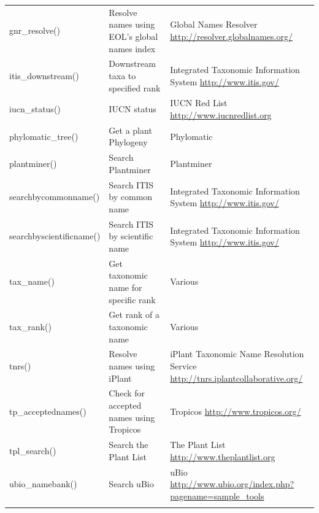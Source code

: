 \begin{sloppypar}
{\begin{longtable}{P{3cm}P{4cm}P{5cm}}
gnr\_resolve() & Resolve names using EOL's global names index & Global Names Resolver \newline \url{http://resolver.globalnames.org/}  \\
itis\_downstream() & Downstream taxa to specified rank & Integrated Taxonomic Information System \newline \url{http://www.itis.gov/}  \\
iucn\_status() & IUCN status & IUCN Red List \newline \url{http://www.iucnredlist.org}  \\
phylomatic\_tree() & Get a plant Phylogeny & Phylomatic \citep{webb2005}  \\
plantminer() & Search Plantminer & Plantminer \citep{carvalho2010plantminer}   \\
searchby\-commonname() & Search ITIS by common name & Integrated Taxonomic Information System \newline \url{http://www.itis.gov/}  \\
searchby\-scientificname() & Search ITIS by scientific name & Integrated Taxonomic Information System \newline \url{http://www.itis.gov/}  \\
tax\_name() & Get taxonomic name for specific rank & Various  \\
tax\_rank() & Get rank of a taxonomic name & Various  \\
tnrs() & Resolve names using iPlant & iPlant Taxonomic Name Resolution Service \newline \url{http://tnrs.iplantcollaborative.org/}  \\
tp\_accepted\-names() & Check for accepted names using Tropicos & Tropicos \newline \url{http://www.tropicos.org/}  \\
tpl\_search() & Search the Plant List & The Plant List \newline \url{http://www.theplantlist.org}  \\
ubio\_namebank() & Search uBio & uBio \newline \url{http://www.ubio.org/index.php?pagename=sample_tools}  \\
\hline
\label{tab:taxize:fnx}
\end{longtable}
}


\end{sloppypar}
